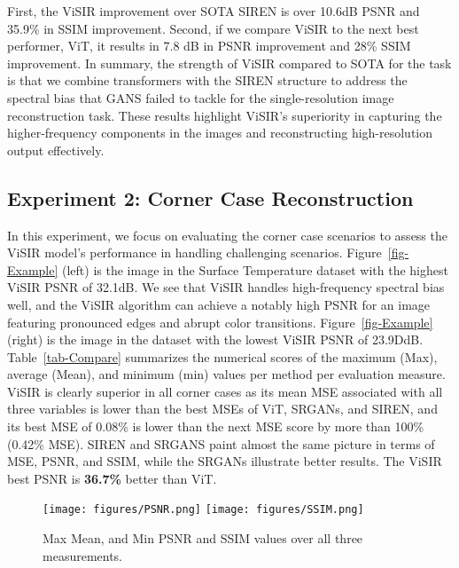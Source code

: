\documentclass[pdflatex,sn-mathphys-num]{sn-jnl}%
\begin{document}
First, the ViSIR improvement over SOTA SIREN is over 10.6dB PSNR and 35.9\% in SSIM improvement. Second, if we compare ViSIR to the next best performer, ViT, it results in 7.8 dB in PSNR improvement and 28\% SSIM improvement. In summary, the strength of ViSIR compared to SOTA for the task is that we combine transformers with the SIREN structure to address the spectral bias that GANS failed to tackle for the single-resolution image reconstruction task. These results highlight ViSIR's superiority in capturing the higher-frequency components in the images and reconstructing high-resolution output effectively.

\subsection{Experiment 2: Corner Case Reconstruction}

In this experiment, we focus on evaluating the corner case scenarios to assess the ViSIR model's performance in handling challenging scenarios. Figure~\ref{fig-Example} (left) is the image in the Surface Temperature dataset with the highest ViSIR PSNR of 32.1dB. We see that ViSIR handles high-frequency spectral bias well, and the ViSIR algorithm can achieve a notably high PSNR for an image featuring pronounced edges and abrupt color transitions. Figure~\ref{fig-Example} (right) is the image in the dataset with the lowest ViSIR PSNR of 23.9DdB. Table~\ref{tab-Compare} summarizes the numerical scores of the maximum (Max), average (Mean), and minimum (min) values per method per evaluation measure. ViSIR is clearly superior in all corner cases as its mean MSE associated with all three variables is lower than the best MSEs of ViT, SRGANs, and SIREN, and its best MSE of 0.08\% is lower than the next MSE score by more than 100\% (0.42\% MSE). SIREN and SRGANS paint almost the same picture in terms of MSE, PSNR, and SSIM, while the SRGANs illustrate better results. The ViSIR best PSNR is \textbf{36.7\%} better than ViT.

\begin{figure*}[!ht]
 \centering
 \texttt{[image: figures/PSNR.png]} 
 \texttt{[image: figures/SSIM.png]} 
  \caption{Max Mean, and Min PSNR and SSIM values over all three measurements.}
 \label{fig-Mean}
\end{figure*}
\end{document}
